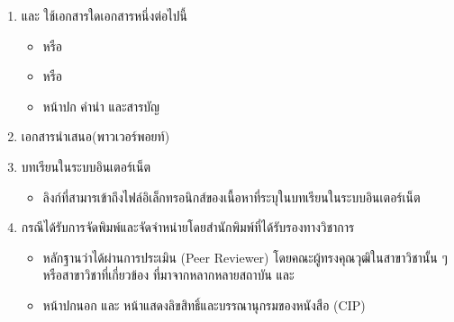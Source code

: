 \documentclass[a4paper,12pt,english]{sphinxmanual}
\begin{document}
\begin{enumerate}
%
\item {} 
{\hyperref[\detokenize{glossary:term-0}]{}} {\hyperref[\detokenize{glossary:term-1}]{}} {\hyperref[\detokenize{glossary:term-2}]{}} และ {\hyperref[\detokenize{glossary:term-3}]{}} ใช้เอกสารใดเอกสารหนึ่งต่อไปนี้
\begin{itemize}
\item {} 
{\hyperref[\detokenize{glossary:term-7}]{}}  หรือ

\item {} 
{\hyperref[\detokenize{glossary:term-8}]{}}  หรือ

\item {} 
หน้าปก คำนำ และสารบัญ

\end{itemize}

\item {} 
เอกสารนำเสนอ(พาวเวอร์พอยท์)

\item {} 
บทเรียนในระบบอินเตอร์เน็ต
\begin{itemize}
\item {} 
ลิงก์ที่สามารเข้าถึงไฟล์อิเล็กทรอนิกส์ของเนื้อหาที่ระบุในบทเรียนในระบบอินเตอร์เน็ต

\end{itemize}

\item {} 
{\hyperref[\detokenize{glossary:term-2}]{}} กรณีได้รับการจัดพิมพ์และจัดจำหน่ายโดยสำนักพิมพ์ที่ได้รับรองทางวิชาการ
\begin{itemize}
\item {} 
หลักฐานว่าได้ผ่านการประเมิน (Peer Reviewer)  โดยคณะผู้ทรงคุณวุฒิในสาขาวิชานั้น ๆ หรือสาขาวิชาที่เกี่ยวข้อง ที่มาจากหลากหลายสถาบัน และ

\item {} 
หน้าปกนอก และ หน้าแสดงลิขสิทธิ์และบรรณานุกรมของหนังสือ (CIP)

\end{itemize}

\end{enumerate}
\end{document}
